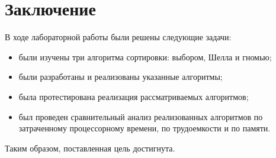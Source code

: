 \chapter*{Заключение}

В ходе лабораторной работы были решены следующие задачи:

\begin{itemize}
	\item были изучены три алгоритма сортировки: выбором, Шелла и гномью;
	\item были разработаны и реализованы указанные алгоритмы;
	\item была протестирована реализация рассматриваемых алгоритмов;
	\item был проведен сравнительный анализ реализованных алгоритмов по затраченному процессорному времени, по трудоемкости и по памяти.
\end{itemize}

Таким образом, поставленная цель достигнута.
